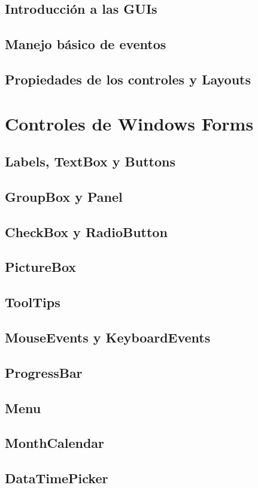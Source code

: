 \documentclass[12pt,a4paper]{report}
\begin{document}
{\section{Introducción a las GUIs}
\section{Manejo básico de eventos}
\section{Propiedades de los controles y Layouts}

\chapter{Controles de Windows Forms}
\section{Labels, TextBox y Buttons}
\section{GroupBox y Panel}
\section{CheckBox y RadioButton}
\section{PictureBox}
\section{ToolTips}
\section{MouseEvents y KeyboardEvents}
\section{ProgressBar}
\section{Menu}
\section{MonthCalendar}
\section{DataTimePicker}
}
\end{document}
